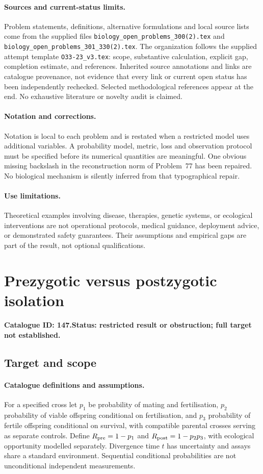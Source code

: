 \documentclass[11pt]{article}
\begin{document}
\paragraph{Sources and current-status limits.}
Problem statements, definitions, alternative formulations and local source lists
come from the supplied files
\texttt{biology\_open\_problems\_300(2).tex} and
\texttt{biology\_open\_problems\_301\_330(2).tex}.
The organization follows the supplied attempt template
\texttt{O33-23\_v3.tex}: scope, substantive calculation, explicit gap,
completion estimate, and references. Inherited source annotations and links are
catalogue provenance, not evidence that every link or current open status has
been independently rechecked. Selected methodological references appear at the
end. No exhaustive literature or novelty audit is claimed.

\paragraph{Notation and corrections.}
Notation is local to each problem and is restated when a restricted model uses
additional variables. A probability model, metric, loss and observation protocol
must be specified before its numerical quantities are meaningful. One obvious
missing backslash in the reconstruction norm of Problem~77 has been repaired.
No biological mechanism is silently inferred from that typographical repair.

\paragraph{Use limitations.}
Theoretical examples involving disease, therapies, genetic systems, or ecological
interventions are not operational protocols, medical guidance, deployment advice,
or demonstrated safety guarantees. Their assumptions and empirical gaps are part
of the result, not optional qualifications.

\setcounter{section}{146}
\section{Prezygotic versus postzygotic isolation}
\label{prob:147}
\noindent\textbf{Catalogue ID: 147.}\quad \textbf{Status: restricted result or obstruction; full target not established.}
\subsection{Target and scope}
\paragraph{Catalogue definitions and assumptions.}
For a specified cross let $p_1$ be probability of mating and fertilisation, $p_2$ probability of viable offspring conditional on fertilisation, and $p_3$ probability of fertile offspring conditional on survival, with compatible parental crosses serving as separate controls. Define $R_{\rm pre}=1-p_1$ and $R_{\rm post}=1-p_2p_3$, with ecological opportunity modelled separately. Divergence time $t$ has uncertainty and assays share a standard environment. Sequential conditional probabilities are not unconditional independent measurements.
\end{document}
